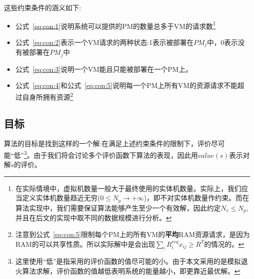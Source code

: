 这些约束条件的涵义如下:

\begin{itemize}
\item 公式~\eqref{eq:con:1}说明系统可以提供的PM的数量总多于VM的请求数\footnote{在实际情境中，虚拟机数量一般大于最终使用的实体机数量。实际上，我们应当定义实体机数量趋近无穷($0 \leq N_p \rightarrow +\infty$)，即不对实体机数量作约束。而在算法实现中，我们需要保证算法能够产生至少一个有效解，因此约定$N_v \leq N_p$,并且在后文的实现中取不同的数据规模进行分析。}  
\item 公式~\eqref{eq:con:2}表示一个VM请求的两种状态:1表示被部署在$PM_j$中，0表示没有被部署在$PM_j$中

\item 公式~\eqref{eq:con:3}说明一个VM能且只能被部署在一个PM上。

\item 公式~\eqref{eq:con:4}和公式~\eqref{eq:con:5}说明每一个PM上所有VM的资源请求不能超过自身所拥有资源\footnote{注意到公式~\eqref{eq:con:5}限制每个PM上的所有VM的\textbf{平均}RAM资源请求，是因为RAM的可以共享性质。所以实际解中是会出现$\sum_i R^{req}_i x_{ij} \geq R^T$的情况的。}
\end{itemize}


\subsection*{目标}
\label{sec:objective}
算法的目标是找到这样的一个解:在满足上述约束条件的限制下，评价尽可能``低''\footnote{这里使用``低''是指采用的评价函数的值尽可能的小。由于本文采用的是模拟退火算法求解，评价函数的值越低表明系统的能量越小，即更靠近最优解。}。由于我们将会讨论多个评价函数下算法的表现，因此用$value(s)$表示对解$s$的评价。



